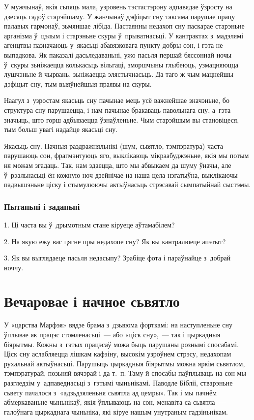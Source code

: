 У мужчынаў, якія сьпяць мала, узровень тэстастэрону адпавядае ўзросту на дзесяць гадоў старэйшаму. У жанчынаў дэфіцыт сну таксама парушае працу палавых гармонаў, зьмяншае лібіда. Пастаянны недахоп сну паскарае старэньне арганізма ў~цэлым і старэньне скуры ў~прыватнасьці. У кантрактах з~мадэлямі агенцтвы пазначаюць у~якасьці абавязковага пункту добры сон, і гэта не выпадкова. Як паказалі дасьледаваньні, ужо пасьля першай бяссоннай ночы ў~скуры зьніжаецца колькасьць вільгаці, зморшчыны глыбеюць, узмацняюцца лушчэньне й чырвань, зьніжаецца элястычнасьць. Да таго ж чым мацнейшы дэфіцыт сну, тым выяўнейшыя праявы на скуры.

Наагул з~узростам якасьць сну пачынае мець усё важнейшае значэньне, бо структура сну парушаецца, і нам пачынае бракаваць павольнага сну, а~гэта значыць, што горш адбываецца ўзнаўленьне. Чым старэйшым вы становіцеся, тым больш увагі надайце якасьці сну.

Якасьць сну. Начныя раздражняльнікі (шум, сьвятло, тэмпэратура) часта парушаюць сон, фрагмэнтуюць яго, выклікаюць мікраабуджэньне, якія мы потым ня можам згадаць. Так, нам здаецца, што мы абвыкаем да шуму ўначы, але ў~рэальнасьці ён кожную ноч дзейнічае на наша цела нэгатыўна, выклікаючы падвышэньне ціску і стымулюючы актыўнасьць стрэсавай сымпатыйнай сыстэмы.

\subsubsection{Пытаньні і заданьні}

1. Ці часта вы ў~дрымотным стане кіруеце аўтамабілем?

2. На якую ежу вас цягне пры недахопе сну? Як вы кантралюеце апэтыт?

3. Як вы выглядаеце пасьля недасыпу? Зрабіце фота і параўнайце з~добрай ноччу.


\section{Вечаровае і начное сьвятло}

У «царства Марфэя» вядзе брама з~дзьвюма форткамі: на наступленьне сну ўплывае як працэс стомленасьці~--- або «ціск сну»,~--- так і цыркадныя біярытмы. Кожны з~гэтых працэсаў можа быць парушаны рознымі спосабамі. Ціск сну аслабляецца лішкам кафэіну, высокім узроўнем стрэсу, недахопам рухальнай актыўнасьці. Парушыць цыркадныя біярытмы можна яркім сьвятлом, тэмпэратурай, позьняй вячэрай і да т.~п. Таму й спосабы паўплываць на сон мы разгледзім у~адпаведнасьці з~гэтымі чыньнікамі. Паводле Бібліі, стварэньне сьвету пачалося з~«адзьдзяленьня сьвятла ад цемры». Так і мы пачнём абмеркаваньне чыньнікаў, якія ўплываюць на сон, менавіта са сьвятла~--- галоўнага цыркаднага чыньніка, які кіруе нашым унутраным гадзіньнікам.

